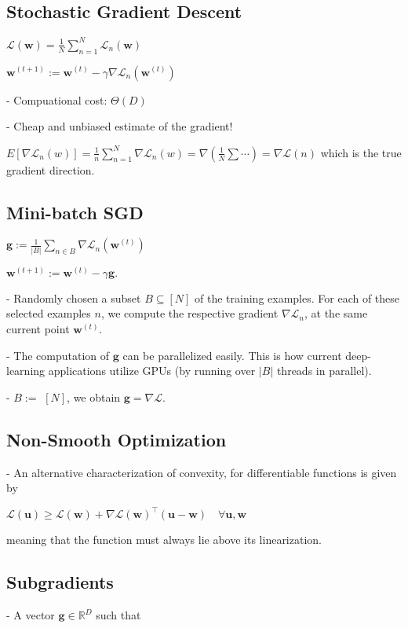 \subsection*{Stochastic Gradient Descent}

$
\mathcal{L}(\mathbf{w})=\frac{1}{N} \sum_{n=1}^{N} \mathcal{L}_{n}(\mathbf{w})
$

$
\mathbf{w}^{(t+1)}:=\mathbf{w}^{(t)}-\gamma \nabla \mathcal{L}_{n}\left(\mathbf{w}^{(t)}\right)
$

- Compuational cost: $\Theta(D)$

- Cheap and unbiased estimate of the gradient!

$E[\nabla \mathcal{L}_n(w)]=\frac1n\sum_{n=1}^N\nabla \mathcal{L}_n(w)=\nabla\left(\frac1N\sum\cdots\right)=\nabla \mathcal{L}(n)$
which is the true gradient direction. 

\subsection*{Mini-batch SGD}

$
\mathbf{g}:=\frac{1}{|B|} \sum_{n \in B} \nabla \mathcal{L}_{n}\left(\mathbf{w}^{(t)}\right)
$

$
\mathbf{w}^{(t+1)}:=\mathbf{w}^{(t)}-\gamma \mathbf{g} .
$

- Randomly chosen a subset $B \subseteq[N]$ of the training examples. For each of these selected examples $n$, we compute the respective gradient $\nabla \mathcal{L}_{n}$, at the same current point $\mathbf{w}^{(t)}$.

- The computation of $\mathbf{g}$ can be parallelized easily. This is how current deep-learning applications utilize GPUs (by running over $|B|$ threads in parallel).

- $B:=$ $[N]$, we obtain $\mathbf{g}=\nabla \mathcal{L}$.

\subsection*{Non-Smooth Optimization}
- An alternative characterization of convexity, for differentiable functions is given by

$\mathcal{L}(\mathbf{u}) \geq \mathcal{L}(\mathbf{w})+\nabla \mathcal{L}(\mathbf{w})^{\top}(\mathbf{u}-\mathbf{w}) \quad \forall \mathbf{u}, \mathbf{w}$

meaning that the function must always lie above its linearization.

\subsection*{Subgradients}
- A vector $\mathbf{g} \in \mathbb{R}^{D}$ such that

